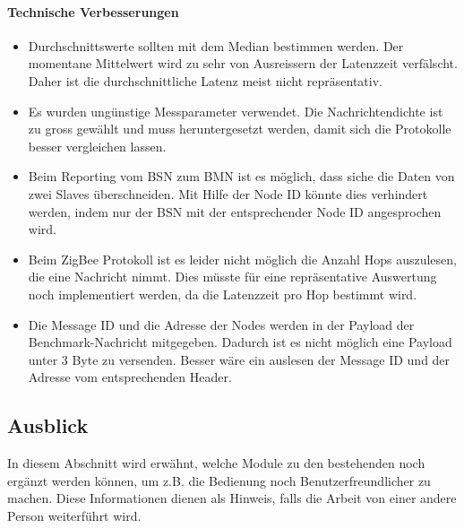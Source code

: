 \paragraph{Technische Verbesserungen}\label{par:Technische_Verbesserungen}
\begin{itemize}
	\item Durchschnittswerte sollten mit dem Median bestimmen werden. Der momentane Mittelwert wird zu sehr von Ausreissern der Latenzzeit verfälscht. Daher ist die durchschnittliche Latenz meist nicht repräsentativ.
	\item Es wurden ungünstige Messparameter verwendet. Die Nachrichtendichte ist zu gross gewählt und muss heruntergesetzt werden, damit sich die Protokolle besser vergleichen lassen.
	\item Beim Reporting vom BSN zum BMN ist es möglich, dass siche die Daten von zwei Slaves überschneiden. Mit Hilfe der Node ID könnte dies verhindert werden, indem nur der BSN mit der entsprechender Node ID angesprochen wird.
	\item Beim ZigBee Protokoll ist es leider nicht möglich die Anzahl Hops auszulesen, die eine Nachricht nimmt. Dies müsste für eine repräsentative Auswertung noch implementiert werden, da die Latenzzeit pro Hop bestimmt wird.
	\item Die Message ID und die Adresse der Nodes werden in der Payload der Benchmark-Nachricht mitgegeben. Dadurch ist es nicht möglich eine Payload unter 3 Byte zu versenden. Besser wäre ein auslesen der Message ID und der Adresse vom entsprechenden Header. 
\end{itemize}

\newpage
\subsection{Ausblick}\label{subsec:Ausblick}
In diesem Abschnitt wird erwähnt, welche Module zu den bestehenden noch ergänzt werden können, um z.B. die Bedienung noch Benutzerfreundlicher zu machen. Diese Informationen dienen als Hinweis, falls die Arbeit von einer andere Person weiterführt wird.

